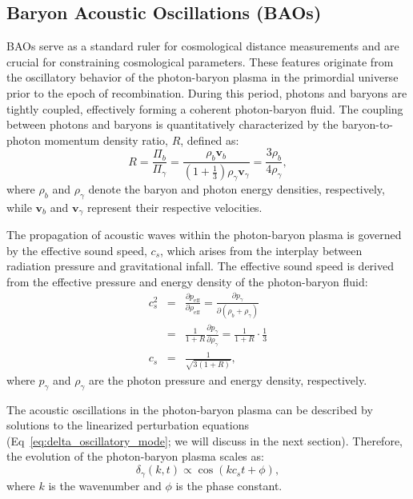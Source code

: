 \subsection{Baryon Acoustic Oscillations (BAOs)}
BAOs serve as a standard ruler for cosmological distance measurements and are crucial for constraining cosmological parameters. These features originate from the oscillatory behavior of the photon-baryon plasma in the primordial universe prior to the epoch of recombination. During this period, photons and baryons are tightly coupled, effectively forming a coherent photon-baryon fluid. The coupling between photons and baryons is quantitatively characterized by the baryon-to-photon momentum density ratio, \( R \), defined as:
\begin{equation}
    R = \frac{\Pi_b}{\Pi_\gamma} = \frac{\rho_b \mathbf{v}_b}{\left(1 + \frac{1}{3}\right) \rho_\gamma \mathbf{v}_\gamma} = \frac{3 \rho_b}{4 \rho_\gamma},
\end{equation}
where \( \rho_b \) and \( \rho_\gamma \) denote the baryon and photon energy densities, respectively, while \( \mathbf{v}_b \) and \( \mathbf{v}_\gamma \) represent their respective velocities. 

The propagation of acoustic waves within the photon-baryon plasma is governed by the effective sound speed, \( c_s \), which arises from the interplay between radiation pressure and gravitational infall. The effective sound speed is derived from the effective pressure and energy density of the photon-baryon fluid:
\begin{eqnarray}
    c_s^2 &=& \frac{\partial p_\mathrm{eff}}{\partial \rho_\mathrm{eff}} = \frac{\partial p_\gamma}{\partial (\rho_b + \rho_\gamma)} \nonumber \\
    &=& \frac{1}{1 + R} \frac{\partial p_\gamma}{\partial \rho_\gamma} = \frac{1}{1 + R} \cdot \frac{1}{3} \nonumber \\
    c_s &=& \frac{1}{\sqrt{3(1 + R)}},
\end{eqnarray}
where \( p_\gamma \) and \( \rho_\gamma \) are the photon pressure and energy density, respectively. 

The acoustic oscillations in the photon-baryon plasma can be described by solutions to the linearized perturbation equations (Eq~\eqref{eq:delta_oscillatory_mode}; we will discuss in the next section). 
Therefore, the evolution of the photon-baryon plasma scales as:
\begin{equation}
    \delta_\gamma(k, t) \propto \cos(k c_s t + \phi),
    \label{eq:gamma_oscillations}
\end{equation}
where \( k \) is the wavenumber and \( \phi \) is the phase constant. 

